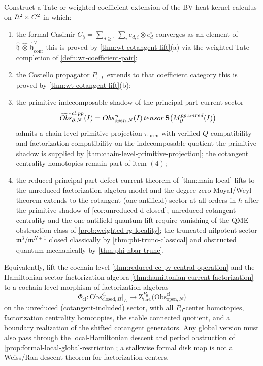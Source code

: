 \documentclass[11pt]{memoir}
\begin{document}
\begin{prob}\label{prob:formal-factorization-center}
  Construct a Tate or weighted-coefficient extension of the BV heat-kernel
  calculus on $R^2\times C^2$ in which:
  \begin{enumerate}
    \item the formal Casimir
      $C_{\mathfrak h}=\sum_{d\geq 1}\sum_i e_{d,i}\otimes e^i_d$
      converges as an element of
      $\widehat{\mathfrak h}\,\widehat\otimes\,
      \widehat{\mathfrak h}^{\vee}_{\mathrm{cont}}$
      this is proved by \ref{thm:wt-cotangent-lift}(a) via the weighted
      Tate completion of \ref{defn:wt-coefficient-pair};
    \item the Costello propagator $P_{\epsilon,L}$ extends to that
      coefficient category
      this is proved by \ref{thm:wt-cotangent-lift}(b);
    \item the primitive indecomposable shadow of the principal-part
      current sector
      $$\widetilde{Obs}^{cl,pp}_{\partial,N}(I)
      =Obs^{cl}_{open,N}(I)\,tensor\,
      \mathbf S\bigl(M^{pp,unred}_\partial(I)\bigr)$$
      admits a chain-level primitive projection $\pi_{\mathrm{prim}}$
      with verified $Q$-compatibility and factorization compatibility on
      the indecomposable quotient
      the primitive shadow is supplied by
      \ref{thm:chain-level-primitive-projection}; the cotangent
      centrality homotopies remain part of item $(4)$;
    \item the reduced principal-part defect-current theorem of
      \ref{thm:main-local} lifts to the unreduced factorization-algebra
      model and the degree-zero Moyal/Weyl theorem extends
      to the cotangent (one-antifield) sector at all orders in $\hbar$
      after the primitive shadow of \ref{cor:unreduced-d-closed};
      unreduced cotangent centrality and the one-antifield quantum lift require
      vanishing of the QME obstruction class of
      \ref{prob:weighted-rg-locality}; the truncated nilpotent sector
      $\mathfrak m^3/\mathfrak m^{N+1}$ closed classically by
      \ref{thm:phi-trunc-classical} and obstructed quantum-mechanically by
      \ref{thm:phi-hbar-trunc}.
  \end{enumerate}

  Equivalently, lift the cochain-level
  \ref{thm:reduced-ce-pv-central-operation} and the Hamiltonian-sector
  factorization-algebra
  \ref{thm:hamiltonian-current-factorization} to a
  cochain-level morphism of factorization algebras
  $$\Phi_{\mathrm{cl}}:
    \mathrm{Obs}^{\mathrm{cl}}_{\mathrm{closed},H}\big|_{L}
    \longrightarrow
    \mathrm Z^{P_0}_{\mathrm{fact}}\bigl(\mathrm{Obs}^{\mathrm{cl}}_{\mathrm{open},N}\bigr)$$
  on the unreduced (cotangent-included) sector, with all $P_0$-center
  homotopies, factorization centrality homotopies, the stable
  connected quotient, and a boundary realization of the shifted
  cotangent generators. Any global version must also pass through the
  local-Hamiltonian descent and period obstruction of
  \ref{prop:formal-local-global-restriction}; a stalkwise formal
  disk map is not a Weiss/Ran descent theorem for factorization
  centers.


\end{prob}
\end{document}
